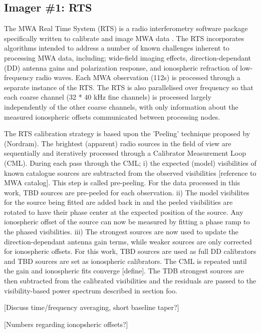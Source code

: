 \subsection{Imager \#1: RTS}
The MWA Real Time System (RTS) is a radio interferometry software package specifically written to calibrate and image MWA data \citep[][,Mitchell et al. in prep]{dale_Cappallo_Morales_Ord_2008}. The RTS incorporates algorithms intended to address a number of known challenges inherent to processing MWA data, including; wide-field imaging effects, direction-dependant (DD) antenna gains and polarization response, and ionospheric refraction of low-frequency radio waves. Each MWA observation (112s) is processed through a separate instance of the RTS. The RTS is also parallelised over frequency so that each coarse channel (32 * 40 kHz fine channels) is processed largely independently of the other coarse channels, with only information about the measured ionospheric offsets communicated between processing nodes.  

The RTS calibration strategy is based upon the 'Peeling' technique proposed by (Nordram). The brightest (apparent) radio sources in the field of view are sequentially and iteratively processed through a Calibrator Measurement Loop (CML). During each pass through the CML; i) the expected (model) visibilities of known catalogue sources are subtracted from the observed visibilities [reference to MWA catalog]. This step is called pre-peeling. For the data processed in this work, TBD sources are pre-peeled for each observation. ii) The model visibilites for the source being fitted are added back in and the peeled visibilities are rotated to have their phase center at the expected position of the source. Any ionospheric offset of the source can now be measured by fitting a phase ramp to the phased visibilities. iii) The strongest sources are now used to update the direction-dependant antenna gain terms, while weaker sources are only corrected for ionospheric offsets. For this work, TBD sources are used as full DD calibrators and TBD sources are set as ionospheric calibrators. The CML is repeated until the gain and ionospheric fits converge [define]. The TDB strongest sources are then subtracted from the calibrated visibilities and the residuals are passed to the visibility-based power spectrum described in section foo.

[Discuss time/frequency averaging, short baseline taper?]

[Numbers regarding ionopsheric offsets?]

